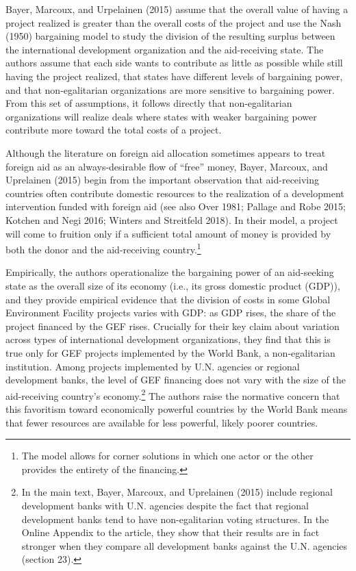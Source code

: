 \documentclass{article}
\begin{document}
Bayer, Marcoux, and Urpelainen (2015) assume that the overall value of having a project realized is greater than the overall costs of the project and use the Nash (1950) bargaining model to study the division of the resulting surplus between the international development organization and the aid-receiving state.  The authors assume that each side wants to contribute as little as possible while still having the project realized, that states have different levels of bargaining power, and that non-egalitarian organizations are more sensitive to bargaining power.  From this set of assumptions, it follows directly that non-egalitarian organizations will realize deals where states with weaker bargaining power contribute more toward the total costs of a project.

Although the literature on foreign aid allocation sometimes appears to treat foreign aid as an always-desirable flow of “free” money, Bayer, Marcoux, and Uprelainen (2015) begin from the important observation that aid-receiving countries often contribute domestic resources to the realization of a development intervention funded with foreign aid (see also Over 1981; Pallage and Robe 2015; Kotchen and Negi 2016; Winters and Streitfeld 2018).  In their model, a project will come to fruition only if a sufficient total amount of money is provided by both the donor and the aid-receiving country.\footnote{The model allows for corner solutions in which one actor or the other provides the entirety of the financing.} 

Empirically, the authors operationalize the bargaining power of an aid-seeking state as the overall size of its economy (i.e., its gross domestic product (GDP)), and they provide empirical evidence that the division of costs in some Global Environment Facility projects varies with GDP: as GDP rises, the share of the project financed by the GEF rises.  Crucially for their key claim about variation across types of international development organizations, they find that this is true only for GEF projects implemented by the World Bank, a non-egalitarian institution.  Among projects implemented by U.N. agencies or regional development banks, the level of GEF financing does not vary with the size of the aid-receiving country’s economy.\footnote{In the main text, Bayer, Marcoux, and Uprelainen (2015) include regional development banks with U.N. agencies despite the fact that regional development banks tend to have non-egalitarian voting structures.  In the Online Appendix to the article, they show that their results are in fact stronger when they compare all development banks against the U.N. agencies (section 23).}   The authors raise the normative concern that this favoritism toward economically powerful countries by the World Bank means that fewer resources are available for less powerful, likely poorer countries.
 
\end{document}
